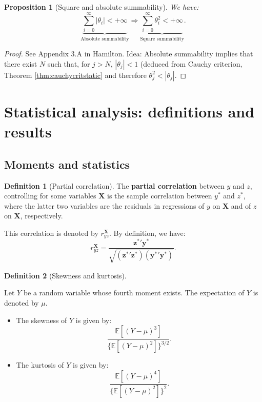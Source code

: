 \documentclass[
  12pt,
]{book}
\providecommand{\tightlist}{%
  \setlength{\itemsep}{0pt}\setlength{\parskip}{0pt}}
\newtheorem{proposition}{Proposition}[chapter]
\theoremstyle{definition}
\newtheorem{definition}{Definition}[chapter]
\theoremstyle{definition}
\theoremstyle{definition}
\theoremstyle{definition}
\theoremstyle{remark}
\begin{document}
\begin{proposition}[Square and absolute summability]
\protect\hypertarget{prp:absMs}{}\label{prp:absMs}We have:
\[
\underbrace{\sum_{i=0}^{\infty}|\theta_i| < + \infty}_{\mbox{Absolute summability}} \Rightarrow \underbrace{\sum_{i=0}^{\infty} \theta_i^2 < + \infty}_{\mbox{Square summability}}.
\]
\end{proposition}

\begin{proof}
See Appendix 3.A in Hamilton. Idea: Absolute summability implies that there exist \(N\) such that, for \(j>N\), \(|\theta_j| < 1\) (deduced from Cauchy criterion, Theorem \ref{thm:cauchycritstatic} and therefore \(\theta_j^2 < |\theta_j|\).
\end{proof}

\hypertarget{variousResults}{%
\section{Statistical analysis: definitions and results}\label{variousResults}}

\hypertarget{moments-and-statistics}{%
\subsection{Moments and statistics}\label{moments-and-statistics}}

\begin{definition}[Partial correlation]
\protect\hypertarget{def:partialcorrel}{}\label{def:partialcorrel}The \textbf{partial correlation} between \(y\) and \(z\), controlling for some variables \(\mathbf{X}\) is the sample correlation between \(y^*\) and \(z^*\), where the latter two variables are the residuals in regressions of \(y\) on \(\mathbf{X}\) and of \(z\) on \(\mathbf{X}\), respectively.

This correlation is denoted by \(r_{yz}^\mathbf{X}\). By definition, we have:
\begin{equation}
r_{yz}^\mathbf{X} = \frac{\mathbf{z^*}'\mathbf{y^*}}{\sqrt{(\mathbf{z^*}'\mathbf{z^*})(\mathbf{y^*}'\mathbf{y^*})}}.\label{eq:pc}
\end{equation}
\end{definition}

\begin{definition}[Skewness and kurtosis]
\protect\hypertarget{def:skewnesskurtosis}{}\label{def:skewnesskurtosis}

Let \(Y\) be a random variable whose fourth moment exists. The expectation of \(Y\) is denoted by \(\mu\).

\begin{itemize}
\tightlist
\item
  The skewness of \(Y\) is given by:
  \[
  \frac{\mathbb{E}[(Y-\mu)^3]}{\{\mathbb{E}[(Y-\mu)^2]\}^{3/2}}.
  \]
\item
  The kurtosis of \(Y\) is given by:
  \[
  \frac{\mathbb{E}[(Y-\mu)^4]}{\{\mathbb{E}[(Y-\mu)^2]\}^{2}}.
  \]
\end{itemize}

\end{definition}
\end{document}
